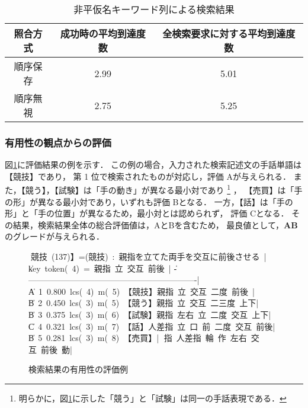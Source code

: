 \begin{table}[htbp]
\caption{非平仮名キーワード列による検索結果}
\label{kekka_one}
\begin{center}
\footnotesize\tabcolsep=3pt
\begin{tabular}{c|c|c}\hline
照合方式   & 成功時の平均到達度数 & 全検索要求に対する平均到達度数 \\
\hline\hline
順序保存 &  2.99     &     5.01   \\
\hline
順序無視 &  2.75     &     5.25   \\ \hline
\end{tabular}
\end{center}
\end{table}







\subsubsection {有用性の観点からの評価}

図\ref{sample_hyouka}に評価結果の例を示す．
この例の場合，入力された検索記述文の手話単語は【競技】であり，
第 1 位で検索されたものが対応し，評価 Aが与えられる．
また，【競う】，【試験】は「手の動き」が異なる最小対であり
\footnote{明らかに，図\ref{sample_hyouka}に示した「競う」と「試験」は同一の手話表現である．}
，
【売買】は「手の形」が異なる最小対であり，いずれも評価 Bとなる．
一方，【話】は「手の形」と「手の位置」が異なるため，最小対とは認められず，
評価 Cとなる．
その結果，検索結果全体の総合評価値は，AとBを含むため，
最良値として，{\bf AB}のグレードが与えられる．

\begin{figure}[tb]
\vbox{\footnotesize\tabcolsep=3pt
\hbox{\|【競技 (137)】=(競技) : 親指を立てた両手を交互に前後させる |}
\hbox{\| key token( 4) = 親指 立 交互 前後                         |}
\hbox{\|--------------------------------------------------------------|}
\hbox{\| A 1 0.800 lcs( 4) m( 5) 【競技】親指 立 交互 二度 前後  |}
\hbox{\| B 2 0.450 lcs( 3) m( 5) 【競う】親指 立 交互 二三度 上下|}
\hbox{\| B 3 0.375 lcs( 3) m( 6) 【試験】親指 左右 立 二度 交互 上下|}
\hbox{\| C 4 0.321 lcs( 3) m( 7) 【話】人差指 立 口 前 二度 交互 前後|}
\hbox{\| B 5 0.281 lcs( 3) m( 8) 【売買】|}
\hbox{\|                          親指 人差指 輪 作 左右 交互 前後 動|}
}
\centerline{}
\caption{検索結果の有用性の評価例}
\label{sample_hyouka}
\end{figure}


